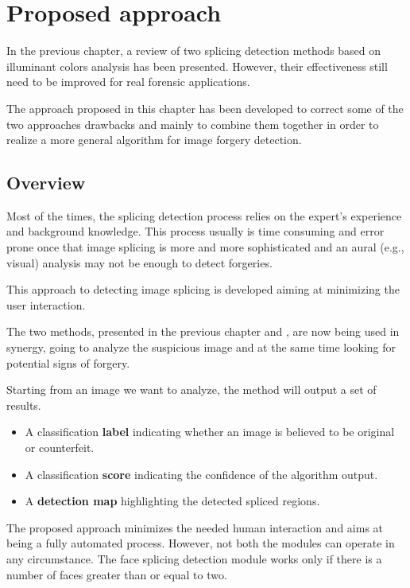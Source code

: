 \chapter{Proposed approach}

In the previous chapter, a review of two splicing detection methods based on illuminant colors analysis has been presented. However, their effectiveness still need to be improved for real forensic applications.

The approach proposed in this chapter has been developed to correct some of the two approaches drawbacks and mainly to combine them together in order to realize a more general algorithm for image forgery detection. 

\section{Overview}

Most of the times, the splicing detection process relies on the expert's experience and background knowledge. This process usually is time consuming and error prone once that image splicing is more and more sophisticated and an aural (e.g., visual) analysis may not be enough to detect forgeries.

This approach to detecting image splicing is developed aiming at minimizing the user interaction. 

The two methods, presented in the previous chapter \cite{carvalho2016illuminant} and \cite{fan2015image}, are now being used in synergy, going to analyze the suspicious image and at the same time looking for potential signs of forgery.

Starting from an image we want to analyze, the method will output a set of results.
\begin{itemize}
\item A classification \textbf{label} indicating whether an image is believed to be original or counterfeit.
\item A classification \textbf{score} indicating the confidence of the algorithm output.
\item A \textbf{detection map} highlighting the detected spliced regions.
\end{itemize}

The proposed approach minimizes the needed human interaction and aims at being a fully automated process. However, not both the modules can operate in any circumstance. The face splicing detection module works only if there is a number of faces greater than or equal to two.

